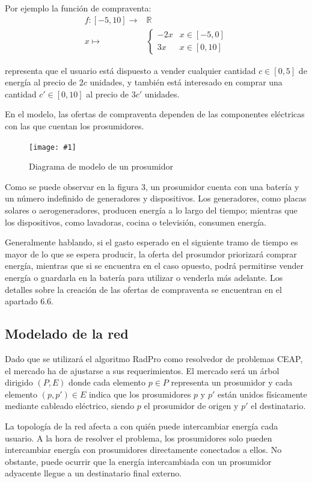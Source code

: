 \documentclass[12pt,a4paper,openright,oneside]{article}
\newcommand{\R}{\mathbb{R}}
\newcommand{\includeImage}[3]
{
	\begin{figure}[H]
	\begin{center}
	\texttt{[image: \#1]}
	\end{center}
	\caption{#3}
	\end{figure}
}
\numberwithin{equation}{section}
\theoremstyle{definition}
\begin{document}
Por ejemplo la función de compraventa:
\begin{align*}
  f \colon [-5,10] \to &\R\\
  x \mapsto& 
  \left\{ \begin{matrix} -2x & x \in [-5,0] \\ 3x & x \in [0,10] \end{matrix} \right.
\end{align*}

representa que el usuario está dispuesto a vender cualquier cantidad $c \in [0,5]$ de energía al precio de $2c$ unidades, y también está interesado en comprar una cantidad $c' \in [0,10]$ al precio de $3c'$ unidades.


En el modelo, las ofertas de compraventa dependen de las componentes eléctricas con las que cuentan los prosumidores.

\includeImage{model_prosumer.png}{8}{ Diagrama de modelo de un prosumidor}

Como se puede observar en la figura 3, un prosumidor cuenta con una batería y un número indefinido de generadores y dispositivos. Los generadores, como placas solares o aerogeneradores, producen energía a lo largo del tiempo; mientras que los dispositivos, como lavadoras, cocina o televisión, consumen energía.

Generalmente hablando, si el gasto esperado en el siguiente tramo de tiempo es mayor de lo que se espera producir, la oferta del prosumdor priorizará comprar energía, mientras que si se encuentra en el caso opuesto, podrá permitirse vender energía o guardarla en la batería para utilizar o venderla más adelante. Los detalles sobre la creación de las ofertas de compraventa se encuentran en el apartado 6.6.

\subsection{Modelado de la red}

Dado que se utilizará el algoritmo RadPro como resolvedor de problemas CEAP, el mercado ha de ajustarse a sus requerimientos. El mercado será un árbol dirigido $(P,E)$ donde cada elemento $p \in P$ representa un prosumidor y cada elemento $(p,p') \in E$ indica que los prosumidores $p$ y $p'$ están unidos físicamente mediante cableado eléctrico, siendo $p$ el prosumidor de origen y $p'$ el destinatario.

La topología de la red afecta a con quién puede intercambiar energía cada usuario. A la hora de resolver el problema, los prosumidores solo pueden intercambiar energía con prosumidores directamente conectados a ellos. No obstante, puede ocurrir que la energía intercambiada con un prosumidor adyacente llegue a un  destinatario final externo. 
\end{document}

